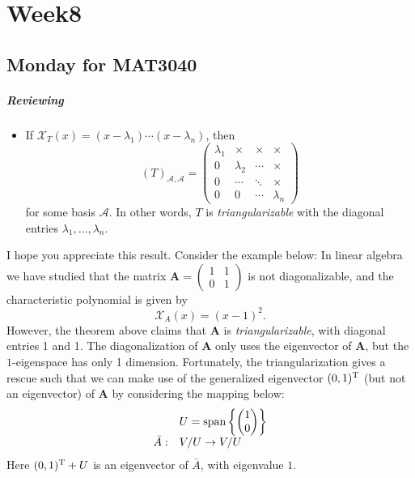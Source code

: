 \chapter{Week8}
\section{Monday for MAT3040}
\paragraph{Reviewing}
\begin{itemize}
\item
If $\mathcal{X}_T(x) =(x-\lambda_1)\cdots(x-\lambda_n)$, then 
\[
(T)_{\mathcal{A},\mathcal{A}}=\begin{pmatrix}
\lambda_1&\times&\times&\times\\
0&\lambda_2&\cdots&\times\\
0&\cdots&\ddots&\times\\
0&0&\cdots&\lambda_n
\end{pmatrix}
\]
for some basis $\mathcal{A}$.
In other words, $T$ is \emph{triangularizable} with the diagonal entries $\lambda_1,\dots,\lambda_n$.
\end{itemize}
\begin{remark}
I hope you appreciate this result. Consider the example below:
In linear algebra we have studied that the matrix $\bm A=\begin{pmatrix}
1&1\\0&1
\end{pmatrix}$ is not diagonalizable, and the characteristic polynomial is given by
\[
\mathcal{X}_{A}(x)=(x-1)^2.
\]
However, the theorem above claims that $\bm A$ is \textit{triangularizable}, with diagonal entries 1 and 1.
The diagonalization of $\bm A$ only uses the eigenvector of $\bm A$, but the $1$-eigenspace has only 1 dimension.
Fortunately, the triangularization gives a rescue such that we can make use of the generalized eigenvector $(0,1)^{\mathrm T}$ (but not an eigenvector) of $\bm A$ by considering the mapping below:
\[
\begin{array}{ll}
&U=\operatorname{span}\left\{\begin{pmatrix}
1\\0
\end{pmatrix}\right\}\\
\bar{A}:&V/U\to V/U
\end{array}
\]
Here $(0,1)^{\mathrm T}+U$ is an eigenvector of $\bar{ A}$, with eigenvalue $1$.
\end{remark}


